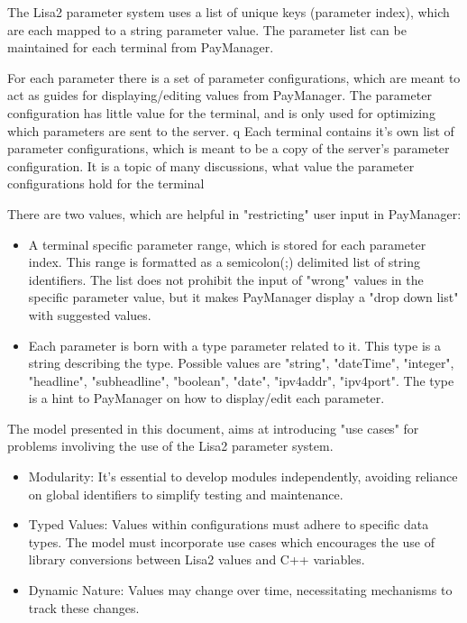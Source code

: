 \documentclass[a4paper,12pt]{article}
\begin{document}
The Lisa2 parameter system uses a list of unique keys (parameter index), which are each mapped to a string parameter value.
The parameter list can be maintained for each terminal from PayManager.  

For each parameter there is a set of parameter configurations, which are meant to act as guides for displaying/editing values from PayManager. 
The parameter configuration has little value for the terminal, and is only used for optimizing which parameters are sent to the server.
q
Each terminal contains it's own list of parameter configurations, which is meant to be a copy of the server's parameter configuration. 
It is a topic of many discussions, what value the parameter configurations hold for the terminal
  

There are two values, which are helpful in "restricting" user input in PayManager:
\begin{itemize}
\item A terminal specific parameter range, which is stored for each parameter index. This range is formatted as a semicolon(;) delimited list of string identifiers. 
The list does not prohibit the input of "wrong" values in the specific parameter value, but it makes PayManager display a "drop down list" with suggested values.
\item Each parameter is born with a type parameter related to it. This type is a string describing the type. Possible values are "string", "dateTime", "integer", "headline",
"subheadline", "boolean", "date", "ipv4addr", "ipv4port". The type is a hint to PayManager on how to display/edit each parameter.
\end{itemize}

The model presented in this document, aims at introducing "use cases" for problems involiving the use of the Lisa2 parameter system.

\begin{itemize}
\item Modularity: It's essential to develop modules independently, avoiding reliance on global identifiers to simplify testing and maintenance.
\item Typed Values: Values within configurations must adhere to specific data types.
\subitem The model must incorporate use cases which encourages the use of library conversions between Lisa2 values and C++ variables. 
\item Dynamic Nature: Values may change over time, necessitating mechanisms to track these changes.
\end{itemize}
\end{document}
